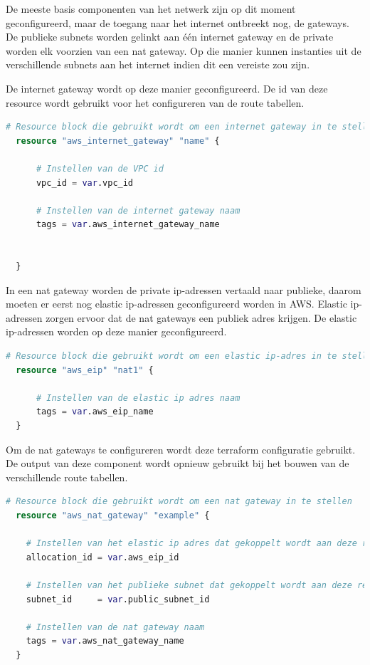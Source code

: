 \vspace{0.5cm}
De meeste basis componenten van het netwerk zijn op dit moment geconfigureerd, maar de toegang naar het internet ontbreekt nog, de gateways. De publieke subnets worden gelinkt aan één internet gateway en de private worden elk voorzien van een nat gateway. Op die manier kunnen instanties uit de verschillende subnets aan het internet indien dit een vereiste zou zijn.
\newline

De internet gateway wordt op deze manier geconfigureerd. De id van deze resource wordt gebruikt voor het configureren van de route tabellen.
\newline

\begin{lstlisting}[language=terraform]  
  # Resource block die gebruikt wordt om een internet gateway in te stellen
  resource "aws_internet_gateway" "name" {
  
      # Instellen van de VPC id
      vpc_id = var.vpc_id
  
      # Instellen van de internet gateway naam
      tags = var.aws_internet_gateway_name
  
    
  }
\end{lstlisting}

\vspace{0.5cm}
In een nat gateway worden de private ip-adressen vertaald naar publieke, daarom moeten er eerst nog elastic ip-adressen geconfigureerd worden in AWS. Elastic ip-adressen zorgen ervoor dat de nat gateways een publiek adres krijgen. De elastic ip-adressen worden op deze manier geconfigureerd.
\newline

\begin{lstlisting}[language=terraform]  
  # Resource block die gebruikt wordt om een elastic ip-adres in te stellen
  resource "aws_eip" "nat1" {
  
      # Instellen van de elastic ip adres naam
      tags = var.aws_eip_name 
  }
\end{lstlisting}

\vspace{0.5cm}
Om de nat gateways te configureren wordt deze terraform configuratie gebruikt. De output van deze component wordt opnieuw gebruikt bij het bouwen van de verschillende route tabellen.
\newline

\begin{lstlisting}[language=terraform]  
  # Resource block die gebruikt wordt om een nat gateway in te stellen
  resource "aws_nat_gateway" "example" {
  
    # Instellen van het elastic ip adres dat gekoppelt wordt aan deze resource
    allocation_id = var.aws_eip_id
  
    # Instellen van het publieke subnet dat gekoppelt wordt aan deze resource
    subnet_id     = var.public_subnet_id
  
    # Instellen van de nat gateway naam
    tags = var.aws_nat_gateway_name
  }
\end{lstlisting}

